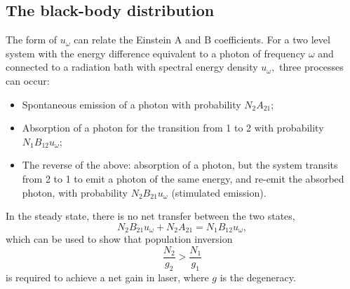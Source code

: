 \documentclass{article}
\theoremstyle{nonumberplain}
\begin{document}
\subsection{The black-body distribution}
The form of $u_\omega$ can relate the Einstein A and B coefficients. For a two level system with the energy difference equivalent to a photon of frequency $\omega$ and connected to a radiation bath with spectral energy density $u_\omega,$ three processes can occur: 
\begin{itemize}
    \item Spontaneous emission of a photon with probability $N_2 A_{21};$
    \item Absorption of a photon for the transition from 1 to 2 with probability $N_1 B_{12} u_\omega;$
    \item The reverse of the above: absorption of a photon, but the system transits from 2 to 1 to emit a photon of the same energy, and re-emit the absorbed photon, with probability $N_2 B_{21} u_{\omega}$ (stimulated emission).
\end{itemize}
In the steady state, there is no net transfer between the two states, 
\[
    N_2 B_{21} u_{\omega } + N_2 A_{21} = N_1 B_{12} u_\omega, 
\]
which can be used to show that population inversion 
\[
    \frac{N_2}{g_2} > \frac{N_1}{g_1}
\]
is required to achieve a net gain in laser, where $g$ is the degeneracy. 
\end{document}
